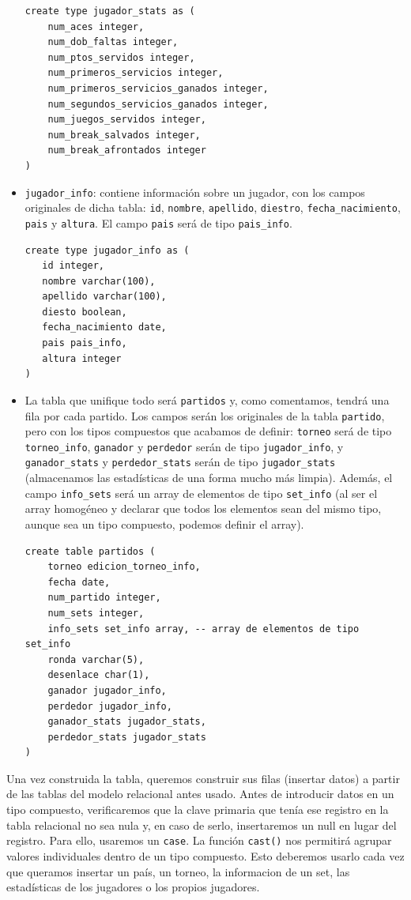 \begin{itemize}
\begin{verbatim}
create type jugador_stats as (
	num_aces integer,
	num_dob_faltas integer,
	num_ptos_servidos integer,
	num_primeros_servicios integer,
	num_primeros_servicios_ganados integer,
	num_segundos_servicios_ganados integer,
	num_juegos_servidos integer,
	num_break_salvados integer,
	num_break_afrontados integer
)
\end{verbatim}
\item \texttt{jugador\_info}: contiene información sobre un jugador, con los campos originales de dicha tabla: \texttt{id}, \texttt{nombre}, \texttt{apellido}, \texttt{diestro}, \texttt{fecha\_nacimiento}, \texttt{pais} y \texttt{altura}. El campo \texttt{pais} será de tipo \texttt{pais\_info}.
\begin{verbatim}
create type jugador_info as (
   id integer,
   nombre varchar(100),
   apellido varchar(100),
   diesto boolean,
   fecha_nacimiento date,
   pais pais_info,
   altura integer
)
\end{verbatim}
\item La tabla que unifique todo será \texttt{partidos} y, como comentamos, tendrá una fila por cada partido. Los campos serán los originales de la tabla \texttt{partido}, pero con los tipos compuestos que acabamos de definir: \texttt{torneo} será de tipo \texttt{torneo\_info}, \texttt{ganador} y \texttt{perdedor} serán de tipo \texttt{jugador\_info}, y \texttt{ganador\_stats} y \texttt{perdedor\_stats} serán de tipo \texttt{jugador\_stats} (almacenamos las estadísticas de una forma mucho más limpia). Además, el campo \texttt{info\_sets} será un array de elementos de tipo \texttt{set\_info} (al ser el array homogéneo y declarar que todos los elementos sean del mismo tipo, aunque sea un tipo compuesto, podemos definir el array).
\begin{verbatim}
create table partidos (
	torneo edicion_torneo_info,
	fecha date,
	num_partido integer,
	num_sets integer,
	info_sets set_info array, -- array de elementos de tipo set_info
	ronda varchar(5), 
	desenlace char(1), 
	ganador jugador_info,
	perdedor jugador_info,
	ganador_stats jugador_stats,
	perdedor_stats jugador_stats
)
\end{verbatim}
\end{itemize}

Una vez construida la tabla, queremos construir sus filas (insertar datos) a partir de las tablas del modelo relacional antes usado. Antes de introducir datos en un tipo compuesto, verificaremos que la clave primaria que tenía ese registro en la tabla relacional no sea nula y, en caso de serlo, insertaremos un null en lugar del registro. Para ello, usaremos un \texttt{case}. La función \texttt{cast()} nos permitirá agrupar valores individuales dentro de un tipo compuesto. Esto deberemos usarlo cada vez que queramos insertar un país, un torneo, la informacion de un set, las estadísticas de los jugadores o los propios jugadores. \\


